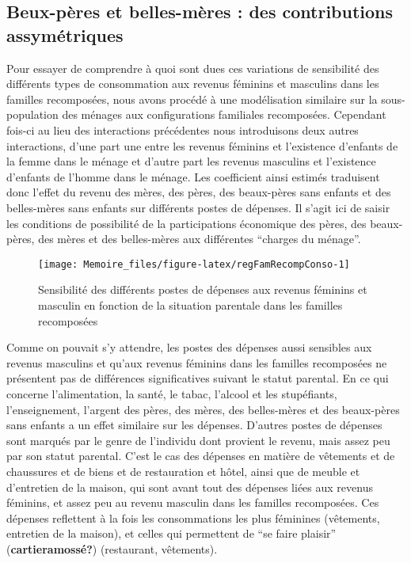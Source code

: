 \documentclass[
  12pt,
]{book}
\begin{document}
\subsection{Beux-pères et belles-mères : des contributions
assymétriques}\label{beux-puxe8res-et-belles-muxe8res-des-contributions-assymuxe9triques}

Pour essayer de comprendre à quoi sont dues ces variations de
sensibilité des différents types de consommation aux revenus féminins et
masculins dans les familles recomposées, nous avons procédé à une
modélisation similaire sur la sous-population des ménages aux
configurations familiales recomposées. Cependant fois-ci au lieu des
interactions précédentes nous introduisons deux autres interactions,
d'une part une entre les revenus féminins et l'existence d'enfants de la
femme dans le ménage et d'autre part les revenus masculins et
l'existence d'enfants de l'homme dans le ménage. Les coefficient ainsi
estimés traduisent donc l'effet du revenu des mères, des pères, des
beaux-pères sans enfants et des belles-mères sans enfants sur différents
postes de dépenses. Il s'agit ici de saisir les conditions de
possibilité de la participations économique des pères, des beaux-pères,
des mères et des belles-mères aux différentes ``charges du ménage''.

\begin{figure}[H]

{\centering \texttt{[image: Memoire\_files/figure-latex/regFamRecompConso-1]} 

}

\caption{Sensibilité des différents postes de dépenses aux revenus féminins et masculin en fonction de la situation parentale dans les familles recomposées}\label{fig:regFamRecompConso}
\end{figure}

Comme on pouvait s'y attendre, les postes des dépenses aussi sensibles
aux revenus masculins et qu'aux revenus féminins dans les familles
recomposées ne présentent pas de différences significatives suivant le
statut parental. En ce qui concerne l'alimentation, la santé, le tabac,
l'alcool et les stupéfiants, l'enseignement, l'argent des pères, des
mères, des belles-mères et des beaux-pères sans enfants a un effet
similaire sur les dépenses. D'autres postes de dépenses sont marqués par
le genre de l'individu dont provient le revenu, mais assez peu par son
statut parental. C'est le cas des dépenses en matière de vêtements et de
chaussures et de biens et de restauration et hôtel, ainsi que de meuble
et d'entretien de la maison, qui sont avant tout des dépenses liées aux
revenus féminins, et assez peu au revenu masculin dans les familles
recomposées. Ces dépenses reflettent à la fois les consommations les
plus féminines (vêtements, entretien de la maison), et celles qui
permettent de ``se faire plaisir'' (\textbf{cartieramossé?})
(restaurant, vêtements).
\end{document}
